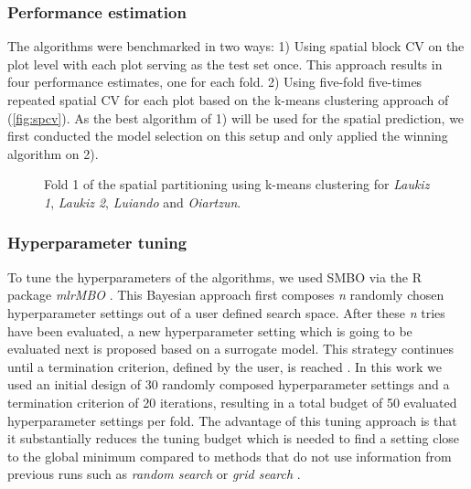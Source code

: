 \documentclass[review]{elsarticle}
\begin{document}
\subsubsection{Performance estimation}

\noindent The algorithms were benchmarked in two ways:
1) Using spatial block \ac{CV} on the plot level with each plot serving as the test set once.
This approach results in four performance estimates, one for each fold.
2) Using five-fold five-times repeated spatial \ac{CV} for each plot based on the k-means clustering approach of \cite{sperrorest} (\autoref{fig:spcv}).
As the best algorithm of 1) will be used for the spatial prediction, we first conducted the model selection on this setup and only applied the winning algorithm on 2).

\begin{figure} [b!]
	\begin{center}
		\caption{Fold 1 of the spatial partitioning using k-means clustering for \textit{Laukiz 1}, \textit{Laukiz 2}, \textit{Luiando} and \textit{Oiartzun}.}
		\label{fig:spcv}
	\end{center}
\end{figure}

\subsubsection{Hyperparameter tuning}

\noindent To tune the hyperparameters of the algorithms, we used \ac{SMBO} via the R package \textit{mlrMBO} \citep{mlrMBO}.
This Bayesian approach first composes \textit{n} randomly chosen hyperparameter settings out of a user defined search space.
After these \textit{n} tries have been evaluated, a new hyperparameter setting which is going to be evaluated next is proposed based on a surrogate model.
This strategy continues until a termination criterion, defined by the user, is reached \citep{Hutter2011, Jones1998}.
In this work we used an initial design of 30 randomly composed hyperparameter settings and a termination criterion of 20 iterations, resulting in a total budget of 50 evaluated hyperparameter settings per fold.
The advantage of this tuning approach is that it substantially reduces the tuning budget which is needed to find a setting close to the global minimum compared to methods that do not use information from previous runs such as \textit{random search} or \textit{grid search} \citep{Bergstra2012}.
\end{document}
